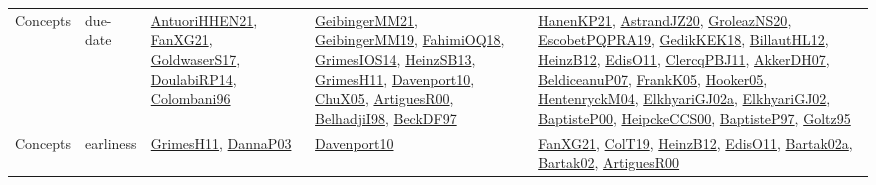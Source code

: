 {\begin{longtable}{lp{3cm}>{\raggedright}p{6cm}>{\raggedright}p{6cm}p{8cm}}
Concepts & due-date & \href{papers/AntuoriHHEN21.pdf}{AntuoriHHEN21}\cite{AntuoriHHEN21}, \href{articles/FanXG21.pdf}{FanXG21}\cite{FanXG21}, \href{papers/GoldwaserS17.pdf}{GoldwaserS17}\cite{GoldwaserS17}, \href{papers/DoulabiRP14.pdf}{DoulabiRP14}\cite{DoulabiRP14}, \href{papers/Colombani96.pdf}{Colombani96}\cite{Colombani96} & \href{papers/GeibingerMM21.pdf}{GeibingerMM21}\cite{GeibingerMM21}, \href{papers/GeibingerMM19.pdf}{GeibingerMM19}\cite{GeibingerMM19}, \href{articles/FahimiOQ18.pdf}{FahimiOQ18}\cite{FahimiOQ18}, \href{articles/GrimesIOS14.pdf}{GrimesIOS14}\cite{GrimesIOS14}, \href{articles/HeinzSB13.pdf}{HeinzSB13}\cite{HeinzSB13}, \href{papers/GrimesH11.pdf}{GrimesH11}\cite{GrimesH11}, \href{papers/Davenport10.pdf}{Davenport10}\cite{Davenport10}, \href{papers/ChuX05.pdf}{ChuX05}\cite{ChuX05}, \href{articles/ArtiguesR00.pdf}{ArtiguesR00}\cite{ArtiguesR00}, \href{articles/BelhadjiI98.pdf}{BelhadjiI98}\cite{BelhadjiI98}, \href{papers/BeckDF97.pdf}{BeckDF97}\cite{BeckDF97} & \href{papers/HanenKP21.pdf}{HanenKP21}\cite{HanenKP21}, \href{articles/AstrandJZ20.pdf}{AstrandJZ20}\cite{AstrandJZ20}, \href{papers/GroleazNS20.pdf}{GroleazNS20}\cite{GroleazNS20}, \href{articles/EscobetPQPRA19.pdf}{EscobetPQPRA19}\cite{EscobetPQPRA19}, \href{articles/GedikKEK18.pdf}{GedikKEK18}\cite{GedikKEK18}, \href{papers/BillautHL12.pdf}{BillautHL12}\cite{BillautHL12}, \href{papers/HeinzB12.pdf}{HeinzB12}\cite{HeinzB12}, \href{papers/EdisO11.pdf}{EdisO11}\cite{EdisO11}, \href{papers/ClercqPBJ11.pdf}{ClercqPBJ11}\cite{ClercqPBJ11}, \href{papers/AkkerDH07.pdf}{AkkerDH07}\cite{AkkerDH07}, \href{papers/BeldiceanuP07.pdf}{BeldiceanuP07}\cite{BeldiceanuP07}, \href{papers/FrankK05.pdf}{FrankK05}\cite{FrankK05}, \href{articles/Hooker05.pdf}{Hooker05}\cite{Hooker05}, \href{papers/HentenryckM04.pdf}{HentenryckM04}\cite{HentenryckM04}, \href{papers/ElkhyariGJ02a.pdf}{ElkhyariGJ02a}\cite{ElkhyariGJ02a}, \href{papers/ElkhyariGJ02.pdf}{ElkhyariGJ02}\cite{ElkhyariGJ02}, \href{articles/BaptisteP00.pdf}{BaptisteP00}\cite{BaptisteP00}, \href{articles/HeipckeCCS00.pdf}{HeipckeCCS00}\cite{HeipckeCCS00}, \href{papers/BaptisteP97.pdf}{BaptisteP97}\cite{BaptisteP97}, \href{papers/Goltz95.pdf}{Goltz95}\cite{Goltz95}\\
Concepts & earliness & \href{papers/GrimesH11.pdf}{GrimesH11}\cite{GrimesH11}, \href{papers/DannaP03.pdf}{DannaP03}\cite{DannaP03} & \href{papers/Davenport10.pdf}{Davenport10}\cite{Davenport10} & \href{articles/FanXG21.pdf}{FanXG21}\cite{FanXG21}, \href{papers/ColT19.pdf}{ColT19}\cite{ColT19}, \href{papers/HeinzB12.pdf}{HeinzB12}\cite{HeinzB12}, \href{papers/EdisO11.pdf}{EdisO11}\cite{EdisO11}, \href{papers/Bartak02a.pdf}{Bartak02a}\cite{Bartak02a}, \href{papers/Bartak02.pdf}{Bartak02}\cite{Bartak02}, \href{articles/ArtiguesR00.pdf}{ArtiguesR00}\cite{ArtiguesR00}\\

\end{longtable}}
